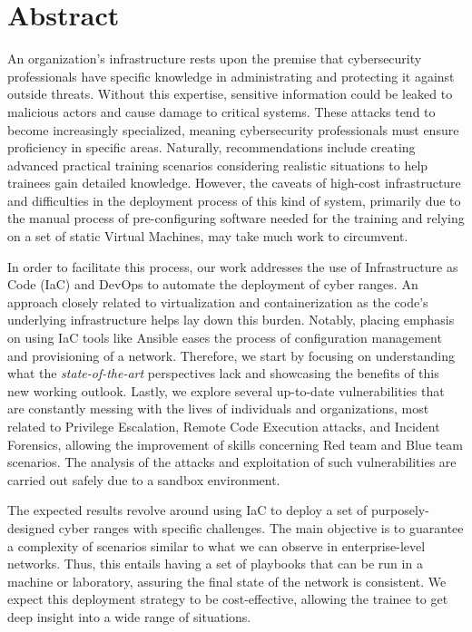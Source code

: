 \chapter*{Abstract}

An organization's infrastructure rests upon the premise that cybersecurity professionals have specific knowledge in administrating and protecting it against outside threats. Without this expertise, sensitive information could be leaked to malicious actors and cause damage to critical systems. These attacks tend to become increasingly specialized, meaning cybersecurity professionals must ensure proficiency in specific areas. Naturally, recommendations include creating advanced practical training scenarios considering realistic situations to help trainees gain detailed knowledge. However, the caveats of high-cost infrastructure and difficulties in the deployment process of this kind of system, primarily due to the manual process of pre-configuring software needed for the training and relying on a set of static Virtual Machines, may take much work to circumvent.

In order to facilitate this process, our work addresses the use of Infrastructure as Code (IaC) and DevOps to automate the deployment of cyber ranges. An approach closely related to virtualization and containerization as the code's underlying infrastructure helps lay down this burden. Notably, placing emphasis on using IaC tools like Ansible eases the process of configuration management and provisioning of a network. Therefore, we start by focusing on understanding what the \textit{state-of-the-art} perspectives lack and showcasing the benefits of this new working outlook. Lastly, we explore several up-to-date vulnerabilities that are constantly messing with the lives of individuals and organizations, most related to Privilege Escalation, Remote Code Execution attacks, and Incident Forensics, allowing the improvement of skills concerning Red team and Blue team scenarios. The analysis of the attacks and exploitation of such vulnerabilities are carried out safely due to a sandbox environment.

The expected results revolve around using IaC to deploy a set of purposely-designed cyber ranges with specific challenges. The main objective is to guarantee a complexity of scenarios similar to what we can observe in enterprise-level networks. Thus, this entails having a set of playbooks that can be run in a machine or laboratory, assuring the final state of the network is consistent. We expect this deployment strategy to be cost-effective, allowing the trainee to get deep insight into a wide range of situations.

